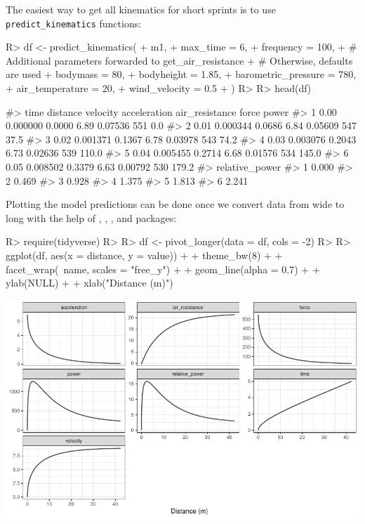 \documentclass[
]{jss}
\begin{document}
The easiest way to get all kinematics for short sprints is to use \texttt{predict\_kinematics} functions:

\begin{CodeChunk}
\begin{CodeInput}
R> df <- predict_kinematics(
+   m1,
+   max_time = 6,
+   frequency = 100,
+   # Additional parameters forwarded to get_air_resistance
+   # Otherwise, defaults are used
+   bodymass = 80,
+   bodyheight = 1.85,
+   barometric_pressure = 780,
+   air_temperature = 20,
+   wind_velocity = 0.5
+ )
R> 
R> head(df)
\end{CodeInput}
\begin{CodeOutput}
#>   time distance velocity acceleration air_resistance force power
#> 1 0.00 0.000000   0.0000         6.89        0.07536   551   0.0
#> 2 0.01 0.000344   0.0686         6.84        0.05609   547  37.5
#> 3 0.02 0.001371   0.1367         6.78        0.03978   543  74.2
#> 4 0.03 0.003076   0.2043         6.73        0.02636   539 110.0
#> 5 0.04 0.005455   0.2714         6.68        0.01576   534 145.0
#> 6 0.05 0.008502   0.3379         6.63        0.00792   530 179.2
#>   relative_power
#> 1          0.000
#> 2          0.469
#> 3          0.928
#> 4          1.375
#> 5          1.813
#> 6          2.241
\end{CodeOutput}
\end{CodeChunk}

Plotting the model predictions can be done once we convert data from wide to long with the help of  \citep{R-ggplot2},  \citep{R-dplyr},  \citep{R-tidyr}, and  \citep{R-tidyverse} packages:

\begin{CodeChunk}
\begin{CodeInput}
R> require(tidyverse)
R> 
R> df <- pivot_longer(data = df, cols = -2)
R> 
R> ggplot(df, aes(x = distance, y = value)) +
+   theme_bw(8) +
+   facet_wrap(~name, scales = "free_y") +
+   geom_line(alpha = 0.7) +
+   ylab(NULL) +
+   xlab("Distance (m)")
\end{CodeInput}


\begin{center}\includegraphics[width=1\linewidth]{paper_files/figure-latex/unnamed-chunk-7-1} \end{center}

\end{CodeChunk}
\end{document}
